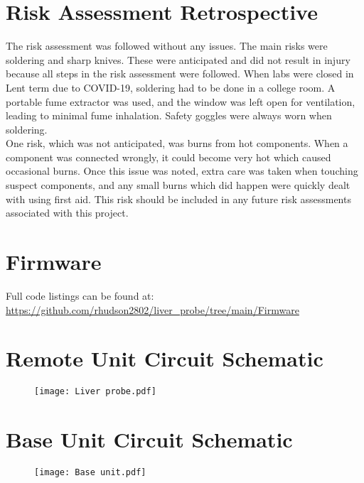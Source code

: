\section{Risk Assessment Retrospective}
The risk assessment was followed without any issues. The main risks were soldering and sharp knives. These were anticipated and did not result in injury because all steps in the risk assessment were followed. When labs were closed in Lent term due to COVID-19, soldering had to be done in a college room. A portable fume extractor was used, and the window was left open for ventilation, leading to minimal fume inhalation. Safety goggles were always worn when soldering.\\

One risk, which was not anticipated, was burns from hot components. When a component was connected wrongly, it could become very hot which caused occasional burns. Once this issue was noted, extra care was taken when touching suspect components, and any small burns which did happen were quickly dealt with using first aid. This risk should be included in any future risk assessments associated with this project.


\section{Firmware}
Full code listings can be found at:\\
\url{https://github.com/rhudson2802/liver_probe/tree/main/Firmware}

\newpage
\singlespacing
\begin{landscape}
\section{Remote Unit Circuit Schematic}
\vspace{-5mm}
\begin{figure}[h!]
	\centering
	\texttt{[image: Liver probe.pdf]}
\end{figure}

\section{Base Unit Circuit Schematic}
\vspace{-5mm}
\begin{figure}[h!]
	\centering
	\texttt{[image: Base unit.pdf]}
\end{figure}
\end{landscape}


